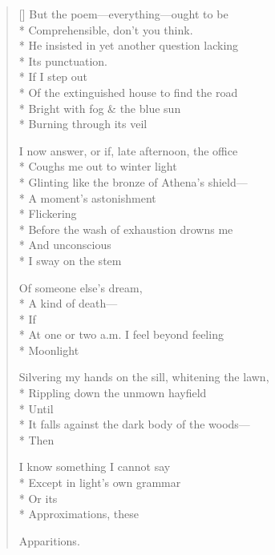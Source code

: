 \label{ch:punctuation}
\settowidth{\versewidth}{Silvering my hands on the sill, whitening the lawn,}
\begin{verse}[\versewidth]
But the poem---everything---ought to be\\*
Comprehensible, don't you think.\\*
He insisted in yet another question lacking\\*
Its punctuation.   \\*
\hspace{3\vgap} If I step out\\*
Of the extinguished house to find the road\\*
Bright with fog \& the blue sun\\*
Burning through its veil

I now answer, or if, late afternoon, the office\\*
Coughs me out to winter light\\*
Glinting like the bronze of Athena's shield---\\*
A moment's astonishment \\*
\hspace{4\vgap} Flickering\\*
Before the wash of exhaustion drowns me\\*
And unconscious \\*
I sway on the stem

Of someone else's dream,\\*
A kind of death---\\*
\hspace{3\vgap} If\\*
At one or two a.m. I feel beyond feeling\\*
Moonlight

Silvering my hands on the sill, whitening the lawn,\\*
Rippling down the unmown hayfield     \\*
\hspace{4\vgap} Until \\*
It falls against the dark body of the woods---\\*
Then

\hspace{2\vgap} I know something I cannot say\\*
Except in light's own grammar\\*
\hspace{5\vgap} Or its\\*
Approximations, these

Apparitions.
\end{verse}
